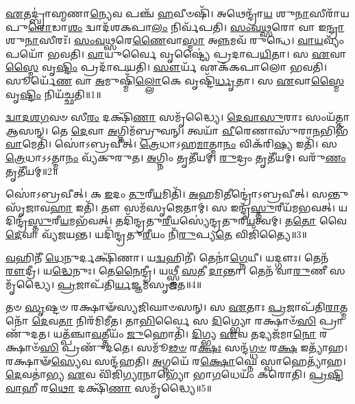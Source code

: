 \setcounter{anuvakam}{0}

\-\ul{𑌏}\-𑌤𑌦𑍍𑌬𑍍𑌰𑌾॑𑌹𑍍𑌮𑌣𑌾\-\ul{𑌨𑍍𑌯𑍇}\-𑌵 𑌪𑌞𑍍𑌚᳴ \ul{𑌹}\-𑌵𑍀𑍞𑌷𑌿᳴।
𑌅𑌥𑍇𑌨𑍍𑌦𑍍𑌰𑌾᳴\-\ul{𑌯} 𑌶𑍁\-\ul{𑌨𑌾}\-𑌸𑍀𑌰𑌾᳴𑌯 𑌪𑍁\-\ul{𑌰𑍋}\-𑌡𑌾\-\ul{𑌶𑌂} 𑌦𑍍𑌵𑌾𑌦᳴𑌶𑌕𑌪𑌾\-\ul{𑌲𑌂} 𑌨𑌿𑌰𑍍𑌵᳴𑌪𑌤𑌿।
\-\ul{𑌸𑌂}\-\-\ul{𑌵}\-\-\ul{𑌥𑍍𑌸}\-𑌰𑍋 𑌵𑌾 𑌇\-\ul{𑌨𑍍𑌦𑍍𑌰𑌾}\-𑌶𑍁\-\ul{𑌨𑌾}\-𑌸𑍀𑌰𑌃᳴।
\-\ul{𑌸𑌂}\-\-\ul{𑌵}\-\-\ul{𑌥𑍍𑌸}\-𑌰𑍇\-\ul{𑌣𑍈}\-𑌵𑌾\-\ul{𑌸𑍍𑌮𑌾} 𑌅\-\ul{𑌨𑍍𑌨}\-𑌮𑌵᳴ 𑌰𑍁𑌨𑍍𑌧𑍇।
\-\ul{𑌵𑌾}\-\-\ul{𑌯}\-𑌵𑍍𑌯𑌂᳴ 𑌪𑌯𑍋᳴ 𑌭𑌵𑌤𑌿।
\-\ul{𑌵𑌾}\-𑌯𑍁𑌰𑍍𑌵𑍈 𑌵𑍃𑌷𑍍𑌟𑍍𑌯𑍈॑ 𑌪𑍍𑌰𑌦𑌾𑌪\-\ul{𑌯𑌿}\-𑌤𑌾।
𑌸 \ul{𑌏}\-𑌵𑌾\-\ul{𑌸𑍍𑌮𑍈} 𑌵𑍃\-\ul{𑌷𑍍𑌟𑌿𑌂} 𑌪𑍍𑌰𑌦𑌾᳴𑌪𑌯𑌤𑌿।
\-\ul{𑌸𑍗}\-𑌰𑍍𑌯᳴ 𑌏𑌕᳴𑌕𑌪𑌾𑌲𑍋 𑌭𑌵𑌤𑌿।
𑌸𑍂𑌰𑍍𑌯𑍇᳴\-\ul{𑌣} 𑌵𑌾 \ul{𑌅}\-𑌮𑍁𑌷𑍍𑌮𑌿𑌁᳴\-\ul{𑌲𑍍𑌲𑍋}\-𑌕𑍇 𑌵𑍃𑌷𑍍𑌟𑌿᳴\-\ul{𑌰𑍍𑌧𑍃}\-𑌤𑌾।
𑌸 \ul{𑌏}\-𑌵𑌾\-\ul{𑌸𑍍𑌮𑍈} 𑌵𑍃\-\ul{𑌷𑍍𑌟𑌿𑌂} 𑌨𑌿𑌯᳴𑌚𑍍𑌛𑌤𑌿॥1॥

\-\ul{𑌦𑍍𑌵𑌾}\-\-\ul{𑌦}\-\-\ul{𑌶}\-\-\ul{𑌗}\-𑌵𑍞 𑌸𑍀\-\ul{𑌰𑌂} 𑌦𑌕𑍍𑌷𑌿᳴\-\ul{𑌣𑌾} 𑌸𑌮𑍃᳴𑌦𑍍𑌧𑍍𑌯𑍈।
\-\ul{𑌦𑍇}\-\-\ul{𑌵𑌾}\-\-\ul{𑌸𑍁}\-𑌰𑌾𑌃 𑌸𑌂𑌯᳴𑌤𑍍𑌤𑌾 𑌆𑌸𑌨𑍍।
𑌤𑍇 \ul{𑌦𑍇}\-𑌵𑌾 \ul{𑌅}\-𑌗𑍍𑌨𑌿𑌮᳴𑌬𑍍𑌰𑍁𑌵𑌨𑍍।
𑌤𑍍𑌵𑌯𑌾᳴ \ul{𑌵𑍀}\-𑌰𑍇𑌣𑌾𑌸𑍁᳴𑌰𑌾\-\ul{𑌨}\-𑌭𑌿𑌭᳴\-\ul{𑌵𑌾}\-𑌮𑍇𑌤𑌿᳴।
𑌸𑍋॑𑌽𑌬𑍍𑌰𑌵𑍀𑌤𑍍।
\-\ul{𑌤𑍍𑌰𑍇}\-𑌧𑌾\-𑌽𑌹\-\ul{𑌮𑌾}\-𑌤𑍍𑌮𑌾\-\ul{𑌨𑌂} 𑌵𑌿𑌕᳴𑌰𑌿\-\ul{𑌷𑍍𑌯} 𑌇𑌤𑌿᳴।
𑌸 \ul{𑌤𑍍𑌰𑍇}\-𑌧𑌾\-𑌽𑌽𑌤𑍍𑌮𑌾\-\ul{𑌨𑌂} 𑌵𑍍𑌯᳴𑌕𑍁𑌰𑍁𑌤।
\-\ul{𑌅}\-𑌗𑍍𑌨𑌿𑌂 𑌤𑍃𑌤𑍀᳴𑌯𑌮𑍍।
\-\ul{𑌰𑍁}\-𑌦𑍍𑌰𑌂 𑌤𑍃𑌤𑍀᳴𑌯𑌮𑍍।
𑌵𑌰𑍁᳴\-\ul{𑌣𑌂} 𑌤𑍃𑌤𑍀᳴𑌯𑌮𑍍॥2॥

𑌸𑍋॑𑌽𑌬𑍍𑌰𑌵𑍀𑌤𑍍।
𑌕 \ul{𑌇}\-𑌦𑌂 \ul{𑌤𑍁}\-𑌰𑍀\-\ul{𑌯}\-𑌮𑌿𑌤𑌿᳴।
\-\ul{𑌅}\-𑌹𑌮𑌿𑌤𑍀𑌨𑍍𑌦𑍍𑌰𑍋॑\-𑌽𑌬𑍍𑌰𑌵𑍀𑌤𑍍।
𑌸𑌨𑍍𑌤𑍁 𑌸𑍃᳴𑌜𑌾𑌵\-\ul{𑌹𑌾} 𑌇𑌤𑌿᳴।
𑌤𑍗 𑌸𑌮᳴𑌸𑍃𑌜𑍇𑌤𑌾𑌮𑍍।
𑌸 𑌇𑌨𑍍𑌦𑍍𑌰᳴\-\ul{𑌸𑍍𑌤𑍁}\-𑌰𑍀𑌯᳴𑌮𑌭𑌵𑌤𑍍।
𑌯𑌦𑌿𑌨𑍍𑌦𑍍𑌰᳴\-\ul{𑌸𑍍𑌤𑍁}\-𑌰𑍀\-\ul{𑌯}\-𑌮𑌭᳴𑌵𑌤𑍍।
𑌤𑌦𑌿᳴𑌨𑍍𑌦𑍍𑌰\-𑌤𑍁\-\ul{𑌰𑍀}\-𑌯𑌸𑍍𑌯𑍇॑𑌨𑍍𑌦𑍍𑌰\-𑌤𑍁𑌰𑍀\-\ul{𑌯}\-𑌤𑍍𑌵𑌮𑍍।
𑌤\-\ul{𑌤𑍋} 𑌵𑍈 \ul{𑌦𑍇}\-𑌵𑌾 𑌵𑍍𑌯᳴𑌜𑌯𑌨𑍍𑌤।
𑌯𑌦𑌿᳴𑌨𑍍𑌦𑍍𑌰𑌤𑍁\-\ul{𑌰𑍀}\-𑌯𑌂 𑌨𑌿᳴\-\ul{𑌰𑍁}\-𑌪𑍍𑌯\-\ul{𑌤𑍇} 𑌵𑌿𑌜𑌿᳴𑌤𑍍𑌯𑍈॥3॥

\-\ul{𑌵}\-𑌹𑌿𑌨𑍀᳴ \ul{𑌧𑍇}\-𑌨𑍁𑌰𑍍𑌦𑌕𑍍𑌷𑌿᳴𑌣𑌾।
𑌯\-\ul{𑌦𑍍𑌵}\-𑌹𑌿𑌨𑍀॑।
𑌤𑍇𑌨𑌾॑\-\ul{𑌗𑍍𑌨𑍇}\-𑌯𑍀।
𑌯𑌦𑍍𑌗𑍗𑌃।
𑌤𑍇𑌨᳴ \ul{𑌰𑍗}\-𑌦𑍍𑌰𑍀।
𑌯\-\ul{𑌦𑍍𑌧𑍇}\-𑌨𑍁𑌃।
𑌤𑍇\-\ul{𑌨𑍈}\-𑌨𑍍𑌦𑍍𑌰𑍀।
𑌯𑌥𑍍𑌸𑍍𑌤𑍍𑌰𑍀 \ul{𑌸}\-𑌤𑍀 \ul{𑌦𑌾}\-𑌨𑍍𑌤𑌾।
𑌤𑍇𑌨᳴ 𑌵𑌾\-\ul{𑌰𑍁}\-𑌣𑍀 𑌸𑌮𑍃᳴𑌦𑍍𑌧𑍍𑌯𑍈।
\-\ul{𑌪𑍍𑌰}\-𑌜𑌾𑌪᳴𑌤𑌿\-\ul{𑌰𑍍𑌯}\-𑌜𑍍𑌞𑌮᳴\-𑌸𑍃𑌜𑌤॥4॥

𑌤𑍞 \ul{𑌸𑍃}\-𑌷𑍍𑌟𑍞 𑌰𑌕𑍍𑌷𑌾𑍟᳴𑌸𑍍𑌯𑌜𑌿𑌘𑌾𑍞𑌸𑌨𑍍।
𑌸 \ul{𑌏}\-𑌤𑌾𑌃 \ul{𑌪𑍍𑌰}\-𑌜𑌾𑌪᳴𑌤𑌿\-\ul{𑌰𑌾}\-𑌤𑍍𑌮𑌨𑍋᳴ \ul{𑌦𑍇}\-𑌵\-\ul{𑌤𑌾} 𑌨𑌿𑌰᳴𑌮𑌿𑌮𑍀𑌤।
𑌤𑌾\-\ul{𑌭𑌿}\-𑌰𑍍𑌵𑍈 𑌸 \ul{𑌦𑌿}\-𑌗𑍍𑌭𑍍𑌯𑍋 𑌰𑌕𑍍𑌷𑌾𑍞᳴\-\ul{𑌸𑌿} 𑌪𑍍𑌰𑌾𑌣𑍁᳴𑌦𑌤।
𑌯𑌤𑍍𑌪᳴𑌞𑍍𑌚𑌾\-\ul{𑌵}\-𑌤𑍍𑌤𑍀𑌯𑌂᳴ \ul{𑌜𑍁}\-𑌹𑍋𑌤𑌿᳴।
\-\ul{𑌦𑌿}\-𑌗𑍍𑌭𑍍𑌯 \ul{𑌏}\-𑌵 𑌤𑌦𑍍𑌯𑌜᳴𑌮𑌾\-\ul{𑌨𑍋} 𑌰𑌕𑍍𑌷𑌾𑍞᳴\-\ul{𑌸𑌿} 𑌪𑍍𑌰𑌣𑍁᳴𑌦𑌤𑍇।
𑌸𑌮𑍂᳴\-\ul{𑌢}\-\-\ul{𑍞} 𑌰\-\ul{𑌕𑍍𑌷𑌃} 𑌸𑌨𑍍𑌦᳴\-\ul{𑌗𑍍𑌧}\-\-\ul{𑍞} 𑌰\-\ul{𑌕𑍍𑌷} 𑌇𑌤𑍍𑌯𑌾᳴𑌹।
𑌰𑌕𑍍𑌷𑌾𑍟᳴\-\ul{𑌸𑍍𑌯𑍇}\-𑌵 𑌸𑌨𑍍𑌦᳴𑌹𑌤𑌿।
\-\ul{𑌅}\-𑌗𑍍𑌨𑌯𑍇᳴ 𑌰\-\ul{𑌕𑍍𑌷𑍋}\-𑌘𑍍𑌨𑍇 𑌸𑍍𑌵𑌾𑌹𑍇𑌤𑍍𑌯𑌾᳴𑌹।
\-\ul{𑌦𑍇}\-𑌵𑌤𑌾॑𑌭𑍍𑌯 \ul{𑌏}\-𑌵 𑌵𑌿᳴𑌜𑌿\-\ul{𑌗𑍍𑌯𑌾}\-𑌨𑌾𑌭𑍍𑌯𑍋᳴ 𑌭𑌾\-\ul{𑌗}\-𑌧𑍇𑌯𑌂᳴ 𑌕𑌰𑍋𑌤𑌿।
\-\ul{𑌪𑍍𑌰}\-\-\ul{𑌷𑍍𑌟𑌿}\-\-\ul{𑌵𑌾}\-𑌹𑍀 𑌰\-\ul{𑌥𑍋} 𑌦𑌕𑍍𑌷𑌿᳴\-\ul{𑌣𑌾} 𑌸𑌮𑍃᳴𑌦𑍍𑌧𑍍𑌯𑍈॥5॥

